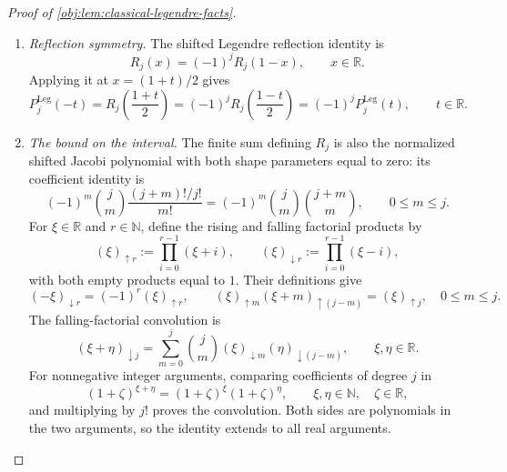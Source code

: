 \documentclass[11pt]{article}
\begin{document}
\begin{proof}[Proof of \cref{obj:lem:classical-legendre-facts}]
\begin{enumerate}
If \(j<k\), the degree of \(R_j\) is \(j\), so \(R_j^{(k)}=0\). Thus
\[
k!\int_0^1R_j(x)R_k(x)\,dx
=(-1)^k\int_0^1R_j^{(k)}(x)\mathcal B_k(x)\,dx
=0,
\]
and the inner product vanishes. If \(k<j\), interchange the two factors and apply the same calculation. Hence
\[
\int_0^1R_j(x)R_k(x)\,dx
=
\begin{cases}
\dfrac{1}{2j+1},&j=k,\\
0,&j\ne k.
\end{cases}
\]
Multiplying the affine-substitution identity by \(2\) proves the asserted inner product on \([-1,1]\).

\item \emph{Reflection symmetry.}
The shifted Legendre reflection identity is
\[
R_j(x)=(-1)^jR_j(1-x),
\qquad x\in\mathbb R.
\]
Applying it at \(x=(1+t)/2\) gives
\[
P_j^{\mathrm{Leg}}(-t)
=R_j\!\left(\frac{1+t}{2}\right)
=(-1)^jR_j\!\left(\frac{1-t}{2}\right)
=(-1)^jP_j^{\mathrm{Leg}}(t),
\qquad t\in\mathbb R.
\]

\item \emph{The bound on the interval.}
The finite sum defining \(R_j\) is also the normalized shifted Jacobi polynomial with both shape parameters equal to zero: its coefficient identity is
\[
(-1)^m\binom jm
\frac{(j+m)!/j!}{m!}
=(-1)^m\binom jm\binom{j+m}{m},
\qquad 0\le m\le j.
\]
For \(\xi\in\mathbb R\) and \(r\in\mathbb N\), define the rising and falling factorial products by
\[
(\xi)_{\uparrow r}:=\prod_{i=0}^{r-1}(\xi+i),
\qquad
(\xi)_{\downarrow r}:=\prod_{i=0}^{r-1}(\xi-i),
\]
with both empty products equal to \(1\). Their definitions give
\[
(-\xi)_{\downarrow r}=(-1)^r(\xi)_{\uparrow r},
\qquad
(\xi)_{\uparrow m}(\xi+m)_{\uparrow(j-m)}
=(\xi)_{\uparrow j},
\quad 0\le m\le j.
\]
The falling-factorial convolution is
\[
(\xi+\eta)_{\downarrow j}
=\sum_{m=0}^j\binom jm
  (\xi)_{\downarrow m}(\eta)_{\downarrow(j-m)},
\qquad \xi,\eta\in\mathbb R.
\]
For nonnegative integer arguments, comparing coefficients of degree \(j\) in
\[
(1+\zeta)^{\xi+\eta}
=(1+\zeta)^\xi(1+\zeta)^\eta,
\qquad \xi,\eta\in\mathbb N,\quad \zeta\in\mathbb R,
\]
and multiplying by \(j!\) proves the convolution. Both sides are polynomials in the two arguments, so the identity extends to all real arguments.


\end{enumerate}
\end{proof}
\end{document}
